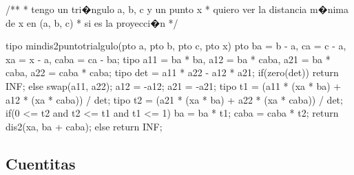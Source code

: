 \documentclass[10pt,landscape,twocolumn,a4paper,notitlepage]{article}
\begin{document}
\begin{code}
/**
 * tengo un tri�ngulo a, b, c y un punto x
 * quiero ver la distancia m�nima de x en (a, b, c)
 * si es la proyecci�n
 */

tipo mindis2puntotrialgulo(pto a, pto b, pto c, pto x) {
    pto ba = b - a, ca = c - a, xa = x - a, caba = ca - ba;
    tipo a11 = ba * ba, a12 = ba * caba, a21 = ba * caba, a22 = caba * caba;
    tipo det = a11 * a22 - a12 * a21;
    if(zero(det)) return INF;
    else {
        swap(a11, a22); a12 = -a12; a21 = -a21;
        tipo t1 = (a11 * (xa * ba) + a12 * (xa * caba)) / det;
        tipo t2 = (a21 * (xa * ba) + a22 * (xa * caba)) / det;
        if(0 <= t2 and t2 <= t1 and t1 <= 1) {
            ba = ba * t1; caba = caba * t2;
            return dis2(xa, ba + caba);
        }
        else return INF;
    }
}
\end{code}
\subsection{Cuentitas}
\end{document}
